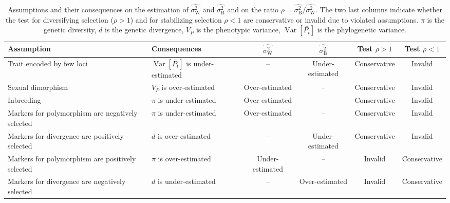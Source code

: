 \documentclass{article}
\DeclareMathOperator{\Var}{\text{Var}}
\newcommand{\Time}{t}
\newcommand{\Trait}{P}
\newcommand{\MeanTrait}{\bar{\Trait_{\Time}}}
\newcommand{\VarPhy}{\Var \left[\MeanTrait\right]}
\newcommand{\VarPhenotype}{V_{\Trait}}
\newcommand{\RatePhy}{\sigma^2_{\mathrm{B}}}
\newcommand{\RatePop}{\sigma^2_{\mathrm{W}}}
\newcommand{\EstRatePhy}{\widehat{\RatePhy}}
\newcommand{\EstRatePop}{\widehat{\RatePop}}
\newcommand{\NI}{\rho}
\begin{document}
\begin{table*}[t!]
    \centering
    \begin{adjustbox}{width = 1.0\textwidth}
    \begin{tabular}{||l|l||c|c||c|c||}
            \hline
            Assumption & Consequences & $\EstRatePop$ & $\EstRatePhy$ & Test $\NI > 1$  & Test $\NI < 1$ \\ \hline \hline
            Trait encoded by few loci & $\VarPhy$ is under-estimated  & -- & Under-estimated & Conservative & Invalid  \\ \hline
            Sexual dimorphism & $\VarPhenotype$ is over-estimated  & Over-estimated & -- & Conservative & Invalid  \\ \hline
            Inbreeding & $\pi$ is under-estimated  & Over-estimated & -- & Conservative & Invalid  \\ \hline
            Markers for polymorphism are negatively selected & $\pi$ is under-estimated  & Over-estimated & -- & Conservative & Invalid  \\ \hline
            Markers for divergence are positively selected & $d$ is over-estimated & -- & Under-estimated & Conservative & Invalid  \\ \hline
            Markers for polymorphism are positively selected & $\pi$ is over-estimated  & Under-estimated & -- & Invalid & Conservative  \\ \hline
            Markers for divergence are negatively selected & $d$ is under-estimated & -- & Over-estimated & Invalid & Conservative  \\ \hline
    \end{tabular}
    \end{adjustbox}
    \caption{Assumptions and their consequences on the estimation of $\EstRatePop$ and $\EstRatePhy$ and on the ratio $\NI = \EstRatePhy/\EstRatePop$.
    The two last columns indicate whether the test for diversifying selection ($\NI > 1$) and for stabilizing selection $\NI < 1$ are conservative or invalid due to violated assumptions.
    $\pi$ is the genetic diversity, $d$ is the genetic divergence, $\VarPhenotype$ is the phenotypic variance, $\VarPhy$ is the phylogenetic variance.
    }
    \label{table:assumptions}
\end{table*}
\end{document}
